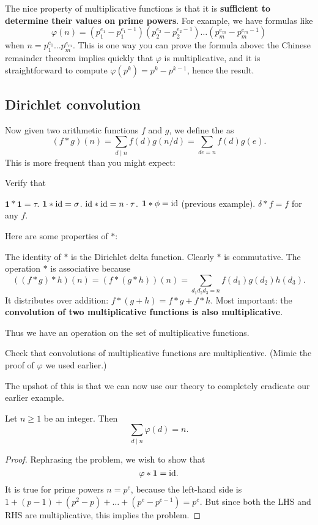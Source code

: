 \documentclass[11pt]{scrartcl}
\begin{document}
The nice property of multiplicative functions is that
it is \textbf{sufficient to determine their values on prime powers}.
For example, we have formulas like
\[
	\varphi(n)
	=
	\left( p_1^{e_1} - p_1^{e_1-1} \right)
	\left( p_2^{e_2} - p_2^{e_2-1} \right)
	\dots
	\left( p_m^{e_m} - p_m^{e_m-1} \right)
\]
when $n = p_1^{e_1} \dots p_m^{e_m}$.
This is one way you can prove the formula above:
the Chinese remainder theorem implies quickly that $\varphi$ is multiplicative,
and it is straightforward to compute $\varphi(p^k) = p^k - p^{k-1}$,
hence the result.

\subsection{Dirichlet convolution}
Now given two arithmetic functions $f$ and $g$, we define
the  as
\[ (f \ast g)(n) = \sum_{d \mid n} f(d) g(n/d)
	= \sum_{de = n} f(d) g(e). \]
This is more frequent than you might expect:
\begin{example}
	Verify that
	\begin{itemize}
		\ii $\mathbf 1 \ast \mathbf 1 = \tau$.
		\ii $\mathbf 1 \ast \mathrm{id} = \sigma$.
		\ii $\mathrm{id} \ast \mathrm{id} = n \cdot \tau$.
		\ii $\mathbf 1 \ast \phi = \mathrm{id}$ (previous example).
		\ii $\delta \ast f = f$ for any $f$.
	\end{itemize}
\end{example}

Here are some properties of $\ast$:
\begin{itemize}
	\ii The identity of $\ast$ is the Dirichlet delta function.
	\ii Clearly $\ast$ is commutative.
	\ii The operation $\ast$ is associative because
	\[
	\left( (f \ast g) \ast h \right)(n)
	= \left( f \ast (g \ast h) \right)(n)
	= \sum_{d_1d_2d_3 = n} f(d_1) g(d_2) h(d_3).
	\]
	\ii It distributes over addition: $f \ast (g+h) = f \ast g + f \ast h$.
	\ii Most important: the \textbf{convolution of two
		multiplicative functions is also multiplicative}.
\end{itemize}
Thus we have an operation on the set of multiplicative functions.
\begin{exercise}
	Check that convolutions of multiplicative functions are multiplicative.
	(Mimic the proof of $\varphi$ we used earlier.)
\end{exercise}

The upshot of this is that we can now use our theory to completely
eradicate our earlier example.
\begin{example}
	[$\varphi \ast \mathbf 1 = \id$]
	Let $n \ge 1$ be an integer. Then
	\[ \sum_{d \mid n} \varphi(d) = n. \]
\end{example}
\begin{proof}
	Rephrasing the problem, we wish to show that
	\[ \varphi \ast \mathbf 1 = \mathrm{id}. \]
	It is true for prime powers $n = p^e$, because the left-hand side is
	$1 + (p-1) + (p^2-p) + \dots + (p^e-p^{e-1}) = p^e$.
	But since both the LHS and RHS are multiplicative, this implies the problem.
\end{proof}
\end{document}
